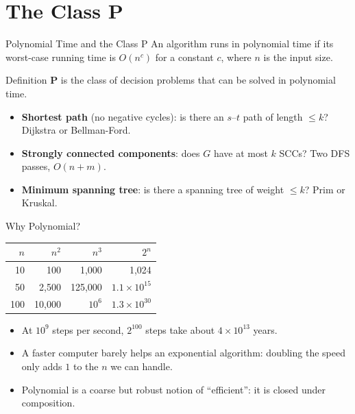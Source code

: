 \documentclass[10pt,aspectratio=169]{beamer}
\begin{document}
\section{The Class P}

\begin{frame}{Polynomial Time and the Class P}
  An algorithm runs in \alert{polynomial time} if its worst-case running time
  is $O(n^c)$ for a constant $c$, where $n$ is the input size.

  \begin{block}{Definition}
    $\mathbf{P}$ is the class of decision problems that can be
    \alert{solved} in polynomial time.
  \end{block}

  \begin{itemize}
    \item \textbf{Shortest path} (no negative cycles): is there an
          $s$--$t$ path of length $\le k$? Dijkstra or Bellman-Ford.
    \item \textbf{Strongly connected components}: does $G$ have at most $k$
          SCCs? Two DFS passes, $O(n + m)$.
    \item \textbf{Minimum spanning tree}: is there a spanning tree of weight
          $\le k$? Prim or Kruskal.
  \end{itemize}
\end{frame}

\begin{frame}{Why Polynomial?}
  \begin{center}
  \begin{tabular}{rrrr}
    \toprule
    $n$ & $n^2$ & $n^3$ & $2^n$ \\
    \midrule
    10  & 100    & 1{,}000     & 1{,}024 \\
    50  & 2{,}500 & 125{,}000  & $1.1 \times 10^{15}$ \\
    100 & 10{,}000 & $10^6$    & $1.3 \times 10^{30}$ \\
    \bottomrule
  \end{tabular}
  \end{center}

  \bigskip
  \begin{itemize}
    \item At $10^9$ steps per second, $2^{100}$ steps take about
          $4 \times 10^{13}$ years.
    \item A faster computer barely helps an exponential algorithm: doubling
          the speed only adds $1$ to the $n$ we can handle.
    \item Polynomial is a coarse but robust notion of ``efficient'': it is
          closed under composition.
  \end{itemize}
\end{frame}
\end{document}
